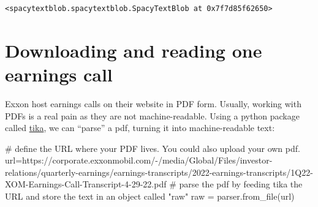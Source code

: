\documentclass[
  letterpaper,
  DIV=11,
  numbers=noendperiod]{scrreprt}
\newenvironment{Shaded}{\begin{snugshade}}{\end{snugshade}}
\newcommand{\CommentTok}[1]{\textcolor[rgb]{0.37,0.37,0.37}{#1}}
\newcommand{\NormalTok}[1]{\textcolor[rgb]{0.00,0.23,0.31}{#1}}
\newcommand{\OperatorTok}[1]{\textcolor[rgb]{0.37,0.37,0.37}{#1}}
\newcommand{\StringTok}[1]{\textcolor[rgb]{0.13,0.47,0.30}{#1}}
\begin{document}
\begin{verbatim}
<spacytextblob.spacytextblob.SpacyTextBlob at 0x7f7d85f62650>
\end{verbatim}

\hypertarget{downloading-and-reading-one-earnings-call}{%
\section{Downloading and reading one earnings
call}\label{downloading-and-reading-one-earnings-call}}

Exxon host earnings calls on their website in PDF form. Usually, working
with PDFs is a real pain as they are not machine-readable. Using a
python package called
\href{https://www.geeksforgeeks.org/parsing-pdfs-in-python-with-tika/}{tika},
we can ``parse'' a pdf, turning it into machine-readable text:

\begin{Shaded}
\begin{Highlighting}[]
\CommentTok{\# define the URL where your PDF lives. You could also upload your own pdf.}
\NormalTok{url}\OperatorTok{=}\StringTok{\textquotesingle{}https://corporate.exxonmobil.com/{-}/media/Global/Files/investor{-}relations/quarterly{-}earnings/earnings{-}transcripts/2022{-}earnings{-}transcripts/1Q22{-}XOM{-}Earnings{-}Call{-}Transcript{-}4{-}29{-}22.pdf\textquotesingle{}}
\CommentTok{\# parse the pdf by feeding tika the URL and store the text in an object called "raw" }
\NormalTok{raw }\OperatorTok{=}\NormalTok{ parser.from\_file(url)}
\end{Highlighting}
\end{Shaded}
\end{document}
